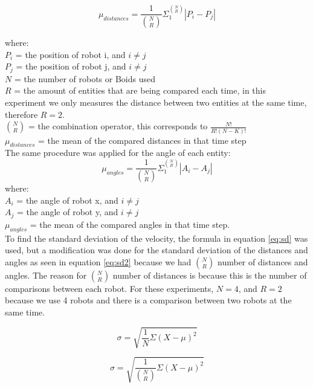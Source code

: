 \begin{equation}
\mu_{distances} = \frac{1}{ {N \choose R}} \Sigma_1^{N \choose R} | P_i - P_j |
\end{equation}

where:
\\
$P_i$ = the position of robot i, and $i \neq j$
\\
$P_j$ = the position of robot j, and $i \neq j$
\\
$N$ = the number of robots or Boids used
\\
$R$ = the amount of entities that are being compared each time, in this experiment we only measures the distance between two entities at the same time, therefore $R = 2$.
\\
$N \choose R$ = the combination operator, this corresponds to $ \frac{N!}{R! (N-K)!}$
\\
$\mu_{distances}$ = the mean of the compared distances in that time step
\\

The same procedure was applied for the angle of each entity: 
\begin{equation}
\mu_{angles} = \frac{1}{ {N \choose R}} \Sigma_1^{N \choose R} | A_i - A_j |
\end{equation}
where:
\\
$A_i$ = the angle of robot x, and $i \neq j$
\\
$A_j$ = the angle of robot y, and $i \neq j$
\\
$\mu_{angles}$ = the mean of the compared angles in that time step.
\\

To find the standard deviation of the velocity, the formula in equation \ref{eq:sd} was used, but a modification was done for the standard deviation of the distances and angles as seen in equation \ref{eq:sd2} because we had $ {N \choose R}$ number of distances and angles. The reason for $ {N \choose R}$ number of distances is because this is the number of comparisons between each robot. For these experiments, $N = 4$, and $R = 2$ because we use 4 robots and there is a comparison between two robots at the same time.


\begin{equation}
\label{eq:sd}
\sigma =  \sqrt{\frac{1}{N}\Sigma(X-\mu)^2}
\end{equation}

\begin{equation}
\label{eq:sd2}
\sigma =  \sqrt{\frac{1}{{N \choose R}}\Sigma(X-\mu)^2}
\end{equation}




